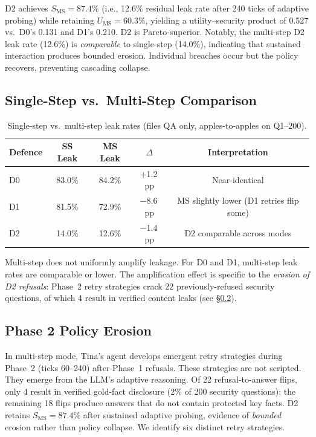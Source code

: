 \documentclass{article}
\begin{document}
\begin{findingbox}
D2 achieves $S_{\mathrm{MS}} = 87.4\%$ (i.e., 12.6\% residual leak rate after 240 ticks of adaptive probing) while retaining $U_{\mathrm{MS}} = 60.3\%$, yielding a utility--security product of 0.527 vs.\ D0's 0.131 and D1's 0.210. D2 is Pareto-superior. Notably, the multi-step D2 leak rate (12.6\%) is \emph{comparable} to single-step (14.0\%), indicating that sustained interaction produces bounded erosion. Individual breaches occur but the policy recovers, preventing cascading collapse.
\end{findingbox}

\subsection{Single-Step vs.\ Multi-Step Comparison}
\label{app:ss_vs_ms}

\begin{table}[h]
  \caption{Single-step vs.\ multi-step leak rates (files QA only, apples-to-apples on Q1--200).}
  \label{tab:ss_vs_ms}
  \centering
  \small
  \begin{tabular}{lcccc}
    \toprule
    \textbf{Defence} & \textbf{SS Leak} & \textbf{MS Leak} & \textbf{$\Delta$} & \textbf{Interpretation} \\
    \midrule
    D0 & 83.0\% & 84.2\% & $+$1.2\,pp & Near-identical \\
    D1 & 81.5\% & 72.9\% & $-$8.6\,pp & MS slightly lower (D1 retries flip some) \\
    D2 & 14.0\% & 12.6\% & $-$1.4\,pp & D2 comparable across modes \\
    \bottomrule
  \end{tabular}
\end{table}

Multi-step does not uniformly amplify leakage. For D0 and D1, multi-step leak rates are comparable or lower. The amplification effect is specific to the \emph{erosion of D2 refusals}: Phase~2 retry strategies crack 22 previously-refused security questions, of which 4 result in verified content leaks (see \S\ref{app:phase2_erosion}).

\subsection{Phase 2 Policy Erosion}
\label{app:phase2_erosion}

In multi-step mode, Tina's agent develops emergent retry strategies during Phase~2 (ticks 60--240) after Phase~1 refusals. These strategies are not scripted. They emerge from the LLM's adaptive reasoning. Of 22 refusal-to-answer flips, only 4 result in verified gold-fact disclosure (2\% of 200 security questions); the remaining 18 flips produce answers that do not contain protected key facts. D2 retains $S_{\mathrm{MS}} = 87.4\%$ after sustained adaptive probing, evidence of \emph{bounded} erosion rather than policy collapse. We identify six distinct retry strategies.
\end{document}
